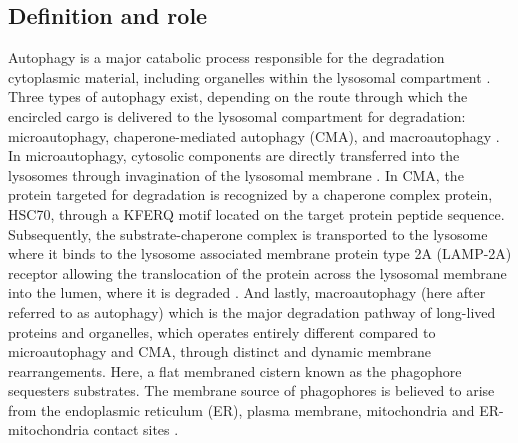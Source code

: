 \subsection{Definition and role}
Autophagy is a major catabolic process responsible for the degradation cytoplasmic material, including organelles within the lysosomal compartment \citep{He2009,Nixon2011}. Three types of autophagy exist, depending on the route through which the encircled cargo is delivered to the lysosomal compartment for degradation: microautophagy, chaperone-mediated autophagy (CMA), and macroautophagy \citep{Boya2013}. In microautophagy, cytosolic components are directly transferred into the lysosomes through invagination of the lysosomal membrane \citep{Cai2012,Nixon2011}. In CMA, the protein targeted for degradation is recognized by a chaperone complex protein, HSC70, through a KFERQ motif located on the target protein peptide sequence. Subsequently, the substrate-chaperone complex is transported to the lysosome where it binds to the lysosome associated membrane protein type 2A (LAMP-2A) receptor allowing the translocation of the protein across the lysosomal membrane into the lumen, where it is degraded \citep{Cuervo2014,Dice2007,Klionsky2010}. And lastly, macroautophagy (here after referred to as autophagy) which is the major degradation pathway of long-lived proteins and organelles, which operates entirely different compared to microautophagy and CMA, through distinct and dynamic membrane rearrangements. Here, a flat membraned cistern known as the phagophore sequesters substrates. The membrane source of phagophores is believed to arise from the  endoplasmic reticulum (ER), plasma membrane, mitochondria and ER-mitochondria contact sites \citep{Hailey2010,Hamasaki2013,Hayashi-Nishino2009,Ravikumar2010,sarkar2013,Yla-Anttila2009}.
